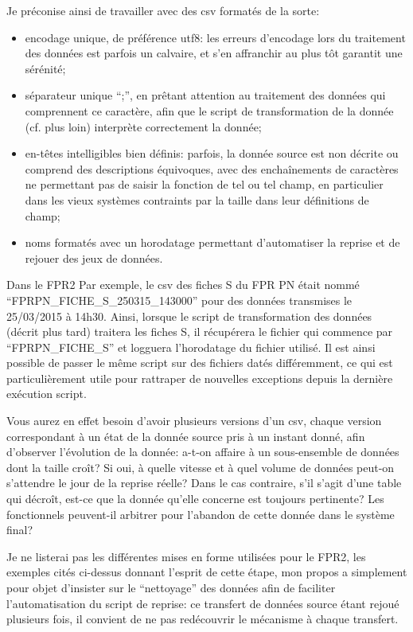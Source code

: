 \documentclass{book}
\begin{document}
Je préconise ainsi de travailler avec des \gls{csv} formatés de la sorte:
\begin{itemize}
 \item encodage unique, de préférence \gls{utf8}: les erreurs d'encodage lors du traitement des données est parfois un calvaire, et s'en affranchir au plus tôt garantit une sérénité;
 \item séparateur unique ``;'', en prêtant attention au traitement des données qui comprennent ce caractère, afin que le script de transformation de la donnée (cf. plus loin) interprète correctement la donnée;
 \item en-têtes intelligibles bien définis: parfois, la donnée source est non décrite ou comprend des descriptions équivoques, avec des enchaînements de caractères ne permettant pas de saisir la fonction de tel ou tel champ, en particulier dans les vieux systèmes contraints par la taille dans leur définitions de champ;
 \item noms formatés avec un horodatage permettant d'automatiser la reprise et de rejouer des jeux de données.
\end{itemize}

\begin{bclogo}[arrondi = 0.1, couleur = blue!10, logo = \bcinfo]{Dans le FPR2}
Par exemple, le \gls{csv} des fiches S du FPR PN était nommé ``FPRPN\_FICHE\_S\_250315\_143000'' pour des données transmises le 25/03/2015 à 14h30. Ainsi, lorsque le script de transformation des données (décrit plus tard) traitera les fiches S, il récupérera le fichier qui commence par ``FPRPN\_FICHE\_S'' et logguera l'horodatage du fichier utilisé. Il est ainsi possible de passer le même script sur des fichiers datés différemment, ce qui est particulièrement utile pour rattraper de nouvelles exceptions depuis la dernière exécution script. 
\end{bclogo}

Vous aurez en effet besoin d'avoir plusieurs versions d'un \gls{csv}, chaque version correspondant à un état de la donnée source pris à un instant donné, afin d'observer l'évolution de la donnée: a-t-on affaire à un sous-ensemble de données dont la taille croît? Si oui, à quelle vitesse et à quel volume de données peut-on s'attendre le jour de la reprise réelle? Dans le cas contraire, s'il s'agit d'une table qui décroît, est-ce que la donnée qu'elle concerne est toujours pertinente? Les \gls{fonctionnels} peuvent-il arbitrer pour l'abandon de cette donnée dans le système final?

Je ne listerai pas les différentes mises en forme utilisées pour le FPR2, les exemples cités ci-dessus donnant l'esprit de cette étape, mon propos a simplement pour objet d'insister sur le ``nettoyage'' des données afin de faciliter l'automatisation du script de reprise: ce transfert de données source étant rejoué plusieurs fois, il convient de ne pas redécouvrir le mécanisme à chaque transfert.
\end{document}
